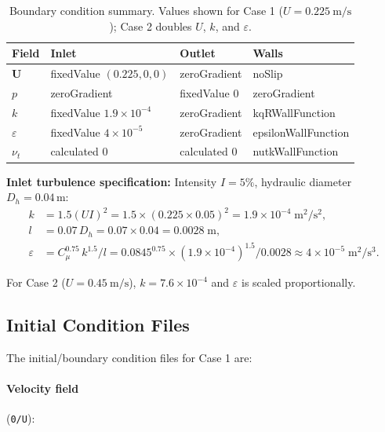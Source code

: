 \documentclass[12pt]{article}
\begin{document}
\begin{table}[H]
\centering
\caption{Boundary condition summary. Values shown for Case 1 ($U=\SI{0.225}{\meter\per\second}$); Case 2 doubles $U$, $k$, and $\varepsilon$.}
\label{tab:bc_summary}
\begin{tabular}{llll}
\toprule
\textbf{Field} & \textbf{Inlet} & \textbf{Outlet} & \textbf{Walls} \\
\midrule
$\mathbf{U}$ & fixedValue $(0.225,0,0)$ & zeroGradient & noSlip \\
$p$ & zeroGradient & fixedValue $0$ & zeroGradient \\
$k$ & fixedValue $1.9 \times 10^{-4}$ & zeroGradient & kqRWallFunction \\
$\varepsilon$ & fixedValue $4 \times 10^{-5}$ & zeroGradient & epsilonWallFunction \\
$\nu_t$ & calculated $0$ & calculated $0$ & nutkWallFunction \\
\bottomrule
\end{tabular}
\end{table}

\noindent\textbf{Inlet turbulence specification:} Intensity $I = 5\%$, hydraulic diameter $D_h = 0.04$\,m:
\begin{align}
    k &= 1.5 (U I)^2 = 1.5 \times (0.225 \times 0.05)^2 = 1.9 \times 10^{-4}\;\text{m}^2/\text{s}^2, \\
    l &= 0.07 \, D_h = 0.07 \times 0.04 = 0.0028\;\text{m}, \\
    \varepsilon &= C_\mu^{0.75} \, k^{1.5} / l = 0.0845^{0.75} \times (1.9 \times 10^{-4})^{1.5} / 0.0028 \approx 4 \times 10^{-5}\;\text{m}^2/\text{s}^3.
\end{align}

For Case 2 ($U = \SI{0.45}{\meter\per\second}$), $k = 7.6 \times 10^{-4}$ and $\varepsilon$ is scaled proportionally.

\subsection{Initial Condition Files}

The initial/boundary condition files for Case 1 are:

\paragraph{Velocity field} (\texttt{0/U}):

\end{document}
